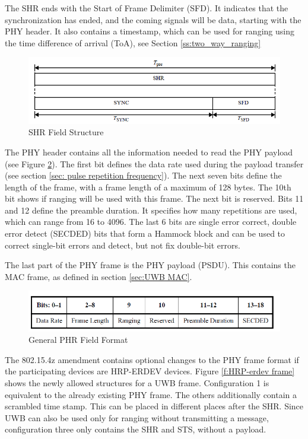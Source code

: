 The SHR ends with the Start of Frame Delimiter (SFD).
It indicates that the synchronization has ended, and the coming signals will be data, starting with the PHY header. 
It also contains a timestamp, which can be used for ranging using the time difference of arrival (ToA), see Section \ref{ss:two_way_ranging}


\begin{figure}[!ht]
\centering
\includegraphics[width=\linewidth]{graphics/SHR_field_structure.png}
\caption{SHR Field Structure \cite{IEEE4-2020-7}}
\label{f:SHR field}
\end{figure}	

The PHY header contains all the information needed to read the PHY payload (see Figure \ref{f:PHR general}).
The first bit defines the data rate used during the payload transfer (see section \ref{sec: pulse repetition frequency}).
The next seven bits define the length of the frame, with a frame length of a maximum of 128 bytes.
The 10th bit shows if ranging will be used with this frame.
The next bit is reserved.
Bits 11 and 12 define the preamble duration. It specifies how many repetitions are used, which can range from 16 to 4096.
The last 6 bits are single error correct, double error detect (SECDED) bits that form a Hammock block and can be used to correct single-bit errors and detect, but not fix double-bit errors.

The last part of the PHY frame is the PHY payload (PSDU).
This contains the MAC frame, as defined in section \ref{sec:UWB MAC}.

\begin{figure}[ht!]
\centering
\includegraphics[width=\linewidth]{graphics/PHR_field_format_4.png}
\caption{General PHR Field Format \cite{IEEE4-2020-7}}
\label{f:PHR general}
\end{figure}

The 802.15.4z amendment contains optional changes to the PHY frame format if the participating devices are HRP-ERDEV devices.
Figure \ref{f:HRP-erdev frame} shows the newly allowed structures for a UWB frame.
Configuration 1 is equivalent to the already existing PHY frame.
The others additionally contain a scrambled time stamp.
This can be placed in different places after the SHR.
Since UWB can also be used only for ranging without transmitting a message, configuration three only contains the SHR and STS, without a payload.

